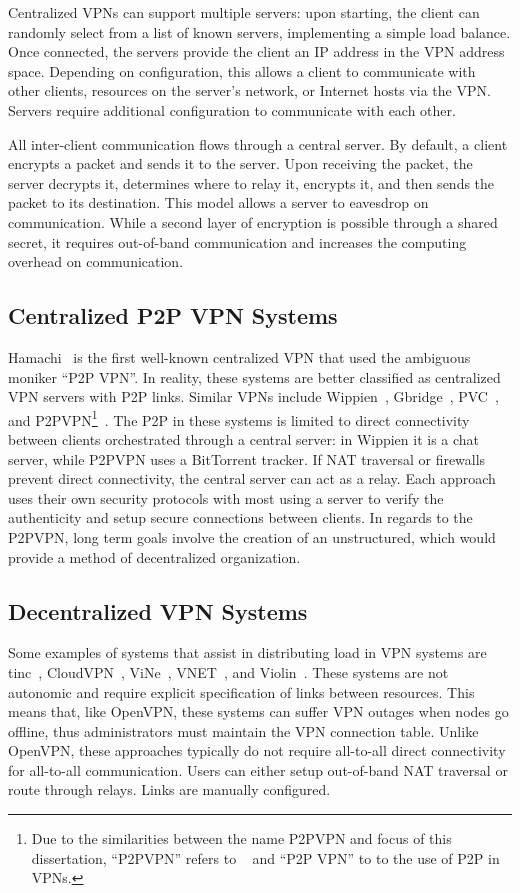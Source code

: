 Centralized VPNs can support multiple servers: upon starting, the client can
randomly select from a list of known servers, implementing a simple load
balance.  Once connected, the servers provide the client an IP address in the
VPN address space. Depending on configuration, this allows a client to
communicate with other clients, resources on the server's network, or Internet
hosts via the VPN.  Servers require additional configuration to communicate
with each other.

All inter-client communication flows through a central server.  By default, a
client encrypts a packet and sends it to the server.  Upon receiving the
packet, the server decrypts it, determines where to relay it, encrypts it, and
then sends the packet to its destination.  This model allows a server to
eavesdrop on communication.  While a second layer of encryption is possible
through a shared secret, it requires out-of-band communication and increases
the computing overhead on communication.


\subsection{Centralized P2P VPN Systems}

Hamachi~\cite{hamachi} is the first well-known centralized VPN that used the
ambiguous moniker ``P2P VPN''.  In reality, these systems are better classified
as centralized VPN servers with P2P links.  Similar VPNs include
Wippien~\cite{wippien}, Gbridge~\cite{gbridge}, PVC~\cite{pvc}, and
P2PVPN\footnote{Due to the similarities between the name P2PVPN and focus of
this dissertation, ``P2PVPN'' refers to ~\cite{p2pvpn} and ``P2P VPN'' to to
the use of P2P in VPNs.}~\cite{p2pvpn}.  The P2P in these systems is limited to
direct connectivity between clients orchestrated through a central server: in
Wippien it is a chat server, while P2PVPN uses a BitTorrent tracker.  If NAT
traversal or firewalls prevent direct connectivity, the central server can act
as a relay.  Each approach uses their own security protocols with most using a
server to verify the authenticity and setup secure connections between clients.
In regards to the P2PVPN, long term goals involve the creation of an
unstructured, which would provide a method of decentralized organization.

\subsection{Decentralized VPN Systems}
Some examples of systems that assist in distributing load in VPN systems are
tinc~\cite{tinc}, CloudVPN~\cite{cloudvpn}, ViNe~\cite{vine}, VNET~\cite{vnet},
and Violin~\cite{violin}.  These systems are not autonomic and require explicit
specification of links between resources.  This means that, like OpenVPN, these
systems can suffer VPN outages when nodes go offline, thus administrators must
maintain the VPN connection table.  Unlike OpenVPN, these approaches typically
do not require all-to-all direct connectivity for all-to-all communication.
Users can either setup out-of-band NAT traversal or route through relays.  Links
are manually configured.

